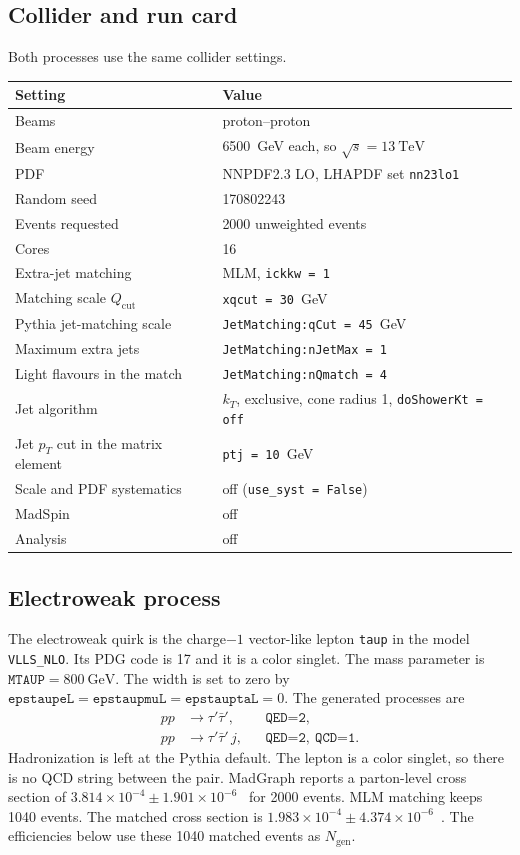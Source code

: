 \documentclass[11pt,a4paper]{article}
\begin{document}
\subsection{Collider and run card}
Both processes use the same collider settings.
\begin{center}
\begin{tabular}{ll}
\toprule
Setting & Value \\
\midrule
Beams & proton--proton \\
Beam energy & \SI{6500}{\GeV} each, so \(\sqrt{s} = \SI{13}{\TeV}\) \\
PDF & NNPDF2.3 LO, LHAPDF set \texttt{nn23lo1} \\
Random seed & 170802243 \\
Events requested & 2000 unweighted events \\
Cores & 16 \\
Extra-jet matching & MLM, \texttt{ickkw = 1} \\
Matching scale \(Q_{\mathrm{cut}}\) & \texttt{xqcut = 30}~\si{\GeV} \\
Pythia jet-matching scale & \texttt{JetMatching:qCut = 45}~\si{\GeV} \\
Maximum extra jets & \texttt{JetMatching:nJetMax = 1} \\
Light flavours in the match & \texttt{JetMatching:nQmatch = 4} \\
Jet algorithm & \(k_T\), exclusive, cone radius 1, \texttt{doShowerKt = off} \\
Jet \(p_T\) cut in the matrix element & \texttt{ptj = 10}~\si{\GeV} \\
Scale and PDF systematics & off (\texttt{use\_syst = False}) \\
MadSpin & off \\
Analysis & off \\
\bottomrule
\end{tabular}
\end{center}

\subsection{Electroweak process}
The electroweak quirk is the charge\(-1\) vector-like lepton \texttt{taup} in the model \texttt{VLLS\_NLO}.
Its PDG code is 17 and it is a color singlet.
The mass parameter is \(\texttt{MTAUP} = \SI{800}{\GeV}\).
The width is set to zero by
\(\texttt{epstaupeL} = \texttt{epstaupmuL} = \texttt{epstauptaL} = 0\).
The generated processes are
\begin{align*}
p p &\to \tau'\bar{\tau}', && \texttt{QED=2}, \\
p p &\to \tau'\bar{\tau}'\, j, && \texttt{QED=2},\ \texttt{QCD=1}.
\end{align*}
Hadronization is left at the Pythia default.
The lepton is a color singlet, so there is no QCD string between the pair.
MadGraph reports a parton-level cross section of
\(3.814\times 10^{-4} \pm 1.901\times 10^{-6}\)~\si{\pb}
for 2000 events.
MLM matching keeps 1040 events.
The matched cross section is
\(1.983\times 10^{-4} \pm 4.374\times 10^{-6}\)~\si{\pb}.
The efficiencies below use these 1040 matched events as \(N_{\mathrm{gen}}\).
\end{document}
